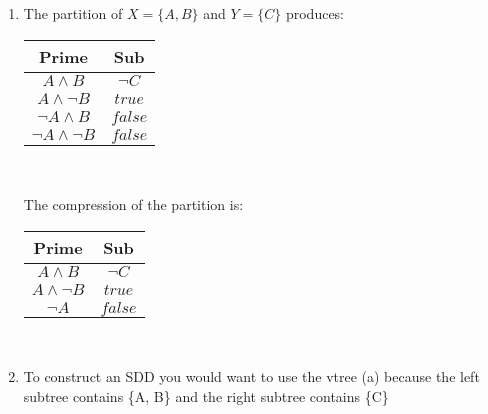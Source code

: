 \documentclass{article}
\begin{document}
\renewcommand{\labelenumi}{(\alph{enumi})}
 \begin{enumerate}
   \item The partition of $X = \{A,B\}$ and $Y = \{C\}$ produces:
   \begin{center}
           \begin{tabular}{ |c|c| }
            \hline
             Prime&Sub \\ 
             \hline
             $A \land B$ & $\lnot C$ \\
             \hline
             $A \land \lnot B$ & $true$ \\
             \hline
             $\lnot A \land B$ & $false$ \\
             \hline
             $\lnot A \land \lnot B$ & $false$ \\
             \hline
            \end{tabular} \\
    \end{center}
    The compression of the partition is:
    \begin{center}
       \begin{tabular}{ |c|c| }
        \hline
         Prime&Sub \\ 
         \hline
         $A \land B$ & $\lnot C$ \\
         \hline
         $A \land \lnot B$ & $true$ \\
         \hline
         $\lnot A$ & $false$ \\
         \hline
        \end{tabular} \\
    \end{center}
        
   \item To construct an SDD you would want to use the vtree (a) because the left subtree contains \{A, B\} and the right subtree contains \{C\} 
 \end{enumerate}

\clearpage
\end{document}
